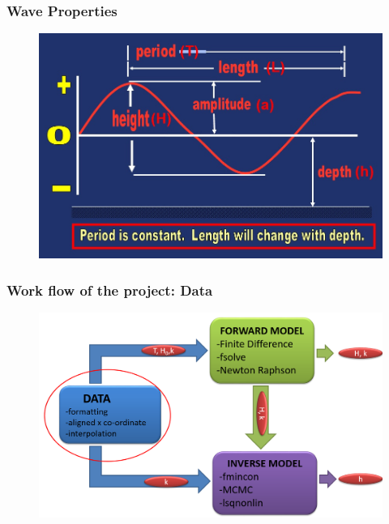 \documentclass[7pt]{beamer}
\begin{document}
\begin{frame}
\frametitle{Wave Properties}
\begin{figure}[flowchart]
\includegraphics[width=1.0\linewidth]{img/Wave.jpg}\hfill
\end{figure}

\end{frame}



\begin{frame}
\frametitle{Work flow of the project: Data }
\begin{figure}[flowchart]
\includegraphics[width=1.0\linewidth]{img/Focus_D.png}\hfill
\end{figure}

\end{frame}
\end{document}
